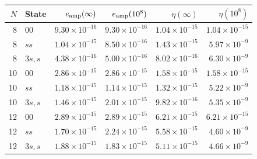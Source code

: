 \begin{tabular}{rlrrrr}\toprule
$N$ & State & $e_{\rm amp}(\infty)$ & $e_{\rm amp}(10^8)$ & $\eta(\infty)$ & $\eta(10^8)$\\\midrule
8 & $00$ & $9.30\times10^{-16}$ & $9.30\times10^{-16}$ & $1.04\times10^{-15}$ & $1.04\times10^{-15}$ \\
8 & $ss$ & $1.04\times10^{-15}$ & $8.50\times10^{-16}$ & $1.43\times10^{-15}$ & $5.97\times10^{-9}$ \\
8 & $3s,s$ & $4.38\times10^{-16}$ & $5.00\times10^{-16}$ & $8.02\times10^{-16}$ & $6.30\times10^{-9}$ \\
10 & $00$ & $2.86\times10^{-15}$ & $2.86\times10^{-15}$ & $1.58\times10^{-15}$ & $1.58\times10^{-15}$ \\
10 & $ss$ & $1.18\times10^{-15}$ & $1.14\times10^{-15}$ & $1.32\times10^{-15}$ & $5.22\times10^{-9}$ \\
10 & $3s,s$ & $1.46\times10^{-15}$ & $2.01\times10^{-15}$ & $9.82\times10^{-16}$ & $5.35\times10^{-9}$ \\
12 & $00$ & $2.89\times10^{-15}$ & $2.89\times10^{-15}$ & $6.21\times10^{-15}$ & $6.21\times10^{-15}$ \\
12 & $ss$ & $1.70\times10^{-15}$ & $2.24\times10^{-15}$ & $5.58\times10^{-15}$ & $4.60\times10^{-9}$ \\
12 & $3s,s$ & $1.88\times10^{-15}$ & $1.83\times10^{-15}$ & $5.11\times10^{-15}$ & $4.66\times10^{-9}$ \\
\bottomrule\end{tabular}
